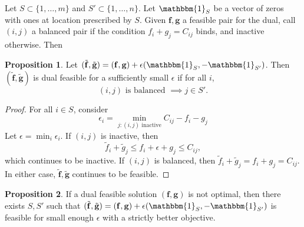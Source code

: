 \documentclass[11pt,reqno]{amsart}
\newcommand{\one}{\mathbbm{1}}
\renewcommand{\b}{\mathbf}
\theoremstyle{definition}
\newtheorem{prop}{Proposition}
\theoremstyle{remark}
\begin{document}
    Let $S \subset \{1,\ldots,m\}$ and $S' \subset \{1,\ldots,n\}.$ Let $\one_S$
    be a vector of zeros with ones at location prescribed by $S$. Given $\b f,
    \b g$ a feasible pair for the dual, call $(i,j)$ a balanced pair if the
    condition $f_i + g_j = C_{ij}$
    binds, and inactive otherwise. Then 
    \begin{prop}
    
        Let $(\tilde {\b f}, \tilde {\b g}) = (\b f, \b g) + \epsilon (\one_S,
        -\one_{S'})$. Then $(\tilde {\b f}, \tilde {\b g})$ is dual feasible for
        a sufficiently small $\epsilon$ if for all $i$, \[
        (i,j) \text{ is balanced } \implies \text{$j \in S'$}.
        \]
    \label{prop:feasible}
    \end{prop}
    \begin{proof}
        For all $i\in S$, consider \[
        \epsilon_i = \min_{j: (i,j) \text{ inactive}} C_{ij} - f_i - g_j
        \]
        Let $\epsilon = \min_i \epsilon_i$. If $(i,j)$ is inactive, then \[
        \tilde f_i + \tilde g_j \le f_i + \epsilon + g_j\le C_{ij},
        \]
        which continues to be inactive. If $(i,j)$ is balanced, then $\tilde
        f_i + \tilde g_j = f_i + g_j = C_{ij}$. In either case, $\tilde {\b f},
        \tilde {\b g}$ continues to be feasible.
    \end{proof}
    
    \begin{prop}
    \label{prop:dualascent}
        If a dual feasible solution $(\b f, \b g)$ is not optimal, then there
        exists $S,S'$ such that $(\tilde {\b f}, \tilde {\b g}) = (\b f, \b g) + \epsilon (\one_S,
        -\one_{S'})$ is feasible for small enough $\epsilon$ with a strictly
        better objective.
    \end{prop}
    
\end{document}
